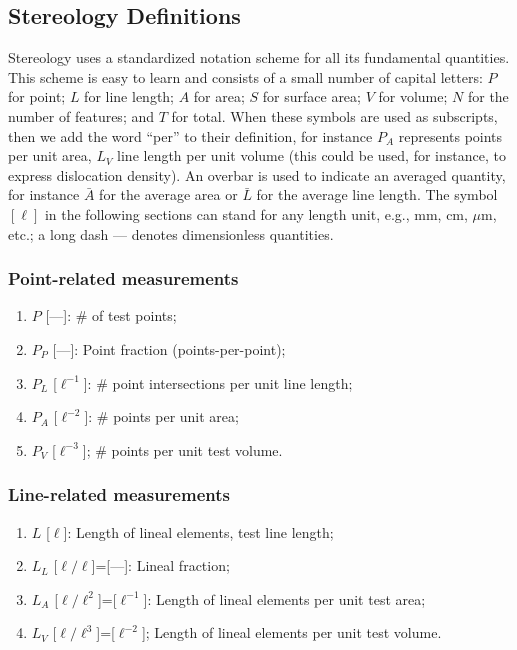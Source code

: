 \subsection{Stereology Definitions}
Stereology uses a standardized notation scheme for all its fundamental quantities.  This scheme is easy to learn and consists of a small number of capital letters: $P$ for point; $L$ for line length; $A$ for area; $S$ for surface area; $V$ for volume; $N$ for the number of features; and $T$ for total. When these symbols are used as subscripts, then we add the word ``per'' to their definition, for instance $P_A$ represents points per unit area, $L_V$ line length per unit volume (this could be used, for instance, to express dislocation density).  An overbar is used to indicate an averaged quantity, for instance $\bar{A}$ for the average area or $\bar{L}$ for the average line length.  The symbol $[\ell]$ in the following sections can stand for any length unit, e.g., mm, cm, $\mu$m, etc.; a long dash --- denotes dimensionless quantities.

\subsubsection{Point-related measurements}

\begin{enumerate}
\item $P$ [---]:  \# of test points;
\item $P_P$ [---]: Point fraction (points-per-point);
\item $P_L$ [$\ell^{-1}$]: \# point intersections per unit line length; 
\item $P_A$ [$\ell^{-2}$]: \# points per unit area;
\item $P_V$ [$\ell^{-3}$]; \# points per unit test volume.
\end{enumerate}

\subsubsection{Line-related measurements}

\begin{enumerate}
\item $L$ [$\ell$]: Length of lineal elements, test line length;
\item $L_L$ [$\ell/\ell$]=[---]: Lineal fraction;
\item $L_A$ [$\ell/\ell^2$]=[$\ell^{-1}$]: Length of lineal elements per unit test area;
\item $L_V$ [$\ell/\ell^3$]=[$\ell^{-2}$]; Length of lineal elements per unit test volume.
\end{enumerate}


